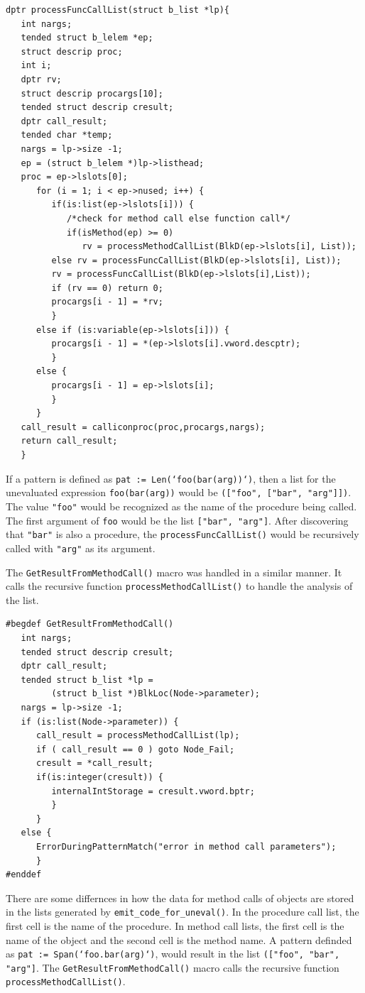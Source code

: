 \documentclass{article}
\begin{document}
\begin{verbatim}
dptr processFuncCallList(struct b_list *lp){
   int nargs;
   tended struct b_lelem *ep;
   struct descrip proc;
   int i;
   dptr rv;
   struct descrip procargs[10];
   tended struct descrip cresult;
   dptr call_result;
   tended char *temp;
   nargs = lp->size -1;
   ep = (struct b_lelem *)lp->listhead;
   proc = ep->lslots[0];
      for (i = 1; i < ep->nused; i++) {
         if(is:list(ep->lslots[i])) {
            /*check for method call else function call*/
            if(isMethod(ep) >= 0) 
               rv = processMethodCallList(BlkD(ep->lslots[i], List));
         else rv = processFuncCallList(BlkD(ep->lslots[i], List));
         rv = processFuncCallList(BlkD(ep->lslots[i],List));
         if (rv == 0) return 0;
         procargs[i - 1] = *rv;
         }
      else if (is:variable(ep->lslots[i])) {
         procargs[i - 1] = *(ep->lslots[i].vword.descptr);
         }
      else {
         procargs[i - 1] = ep->lslots[i];
         }
      }
   call_result = calliconproc(proc,procargs,nargs);
   return call_result;
   }
\end{verbatim}
If a pattern is defined as \texttt{pat := Len(`foo(bar(arg))`)}, then a list for the unevaluated expression \texttt{foo(bar(arg))} would be \texttt{(["foo", ["bar", "arg"]])}.  The value \texttt{"foo"} would be recognized as the name of the procedure being called.  The first argument of \texttt{foo} would be the list \texttt{["bar", "arg"]}.  After discovering that \texttt{"bar"} is also a procedure, the \texttt{processFuncCallList()} would be recursively called with \texttt{"arg"} as its argument.

The \texttt{GetResultFromMethodCall()} macro was handled in a similar manner.  It calls the recursive function \texttt{processMethodCallList()} to handle the analysis of the list.\\

\begin{verbatim}
#begdef GetResultFromMethodCall()
   int nargs;
   tended struct descrip cresult;
   dptr call_result;
   tended struct b_list *lp = 
         (struct b_list *)BlkLoc(Node->parameter);
   nargs = lp->size -1;
   if (is:list(Node->parameter)) {
      call_result = processMethodCallList(lp);
      if ( call_result == 0 ) goto Node_Fail;
      cresult = *call_result;
      if(is:integer(cresult)) {
         internalIntStorage = cresult.vword.bptr;
         }
      }
   else {
      ErrorDuringPatternMatch("error in method call parameters");
      }
#enddef
\end{verbatim}
There are some differnces in how the data for method calls of objects are stored in the lists generated by \texttt{emit\_code\_for\_uneval()}.  In the procedure call list, the first cell is the name of the procedure.  In method call lists, the first cell is the name of the object and the second cell is the method name.  A pattern definded as \texttt{pat := Span(`foo.bar(arg)`)}, would result in the list \texttt{(["foo", "bar", "arg"]}.  The \texttt{GetResultFromMethodCall()} macro calls the recursive function \newline\texttt{processMethodCallList()}. \\
\end{document}
